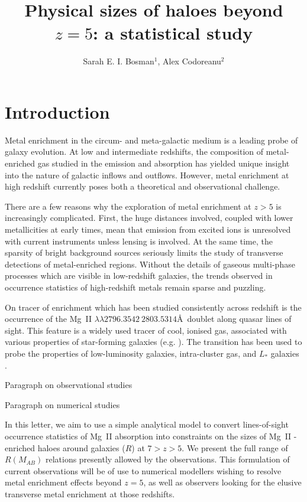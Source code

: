 \documentclass[useAMS,usenatbib]{mn2e}
\author[Bosman \& Codoreanu]
  {Sarah E. I. Bosman$^{1}$, Alex Codoreanu$^{2}$}
\title{Physical sizes of \magtwo haloes beyond $z=5$: a statistical study}
\date{}
\newcommand{\magtwo}{Mg~{\small II} }
\begin{document}
\maketitle

\begin{abstract}

\end{abstract}

\section{Introduction}

Metal enrichment in the circum- and meta-galactic medium is a leading probe of galaxy evolution.
At low and intermediate redshifts, the composition of metal-enriched gas studied in the emission and absorption has yielded unique insight into the nature of galactic inflows and outflows.  
However, metal enrichment at high redshift currently poses both a theoretical and observational challenge. 

There are a few reasons why the exploration of metal enrichment at $z>5$ is increasingly complicated. First, the huge distances involved, coupled with lower metallicities at early times, mean that emission from excited ions is unresolved with current instruments unless lensing is involved. At the same time, the sparsity of bright background sources seriously limits the study of transverse detections of metal-enriched regions. Without the details of gaseous multi-phase processes which are visible in low-redshift galaxies, the trends observed in occurrence statistics of high-redshift metals remain sparse and puzzling.

On tracer of enrichment which has been studied consistently across redshift is the occurrence of the \magtwo $\lambda \lambda 2796.3542 \ 2803.5314$\AA \ doublet along quasar lines of sight. This feature is a widely used tracer of cool, ionised gas, associated with various properties of star-forming galaxies (e.g. \citealt{Churchill99, Churchill13, Menard09, Weiner09, Chen10, Kacprzak11, Matejek12}). The transition has been used to probe the properties of low-luminosity galaxies, intra-cluster gas, and $L_*$ galaxies \citep{Churchill99, Gauthier13, Bergeron91, Steidel94}.

Paragraph on observational studies

Paragraph on numerical studies

In this letter, we aim to use a simple analytical model to convert lines-of-sight occurrence statistics of \magtwo absorption into constraints on the sizes of \magtwo-enriched haloes around galaxies ($R$) at $7>z>5$. We present the full range of $R(M_{AB})$ relations presently allowed by the observations. This formulation of current observations will be of use to numerical modellers wishing to resolve metal enrichment effects beyond $z=5$, as well as observers looking for the elusive transverse metal enrichment at those redshifts.
\end{document}
